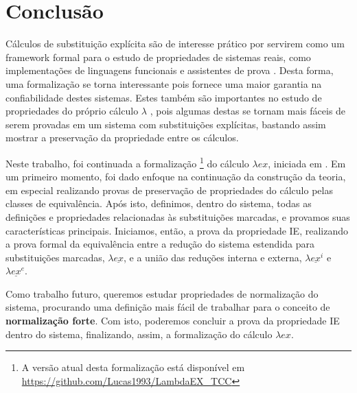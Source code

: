\chapter{Conclusão}

Cálculos de substituição explícita são de interesse prático por servirem como um
framework formal para o estudo de propriedades de sistemas reais, como
implementações de linguagens funcionais e assistentes de prova \cite{levy1999}.
Desta forma, uma formalização se torna interessante pois fornece uma maior
garantia na confiabilidade destes sistemas. Estes também são importantes no
estudo de propriedades do próprio cálculo $\lambda$ \cite{ben_cbv, ben_beta},
pois algumas destas se tornam mais fáceis de serem provadas em um sistema com
substituições explícitas, bastando assim mostrar a preservação da propriedade
entre os cálculos.

Neste trabalho, foi continuada a formalização \footnote{ A versão atual desta
    formalização está disponível em
    \url{https://github.com/Lucas1993/LambdaEX_TCC}} do cálculo $\lambda ex$,
iniciada em \cite{initial}. Em um primeiro momento, foi dado enfoque na
continuação da construção da teoria, em especial realizando provas de
preservação de propriedades do cálculo pelas classes de equivalência. Após isto,
definimos, dentro do sistema, todas as definições e propriedades relacionadas às
substituições marcadas, e provamos suas características principais. Iniciamos,
então, a prova da propriedade IE, realizando a prova formal da equivalência
entre a redução do sistema estendida para substituições marcadas, $\lambda
\underline{ex}$, e a união das reduções interna e externa, $\lambda
\underline{ex}^i$ e $\lambda \underline{ex}^e$.

Como trabalho futuro, queremos estudar propriedades de normalização do sistema,
procurando uma definição mais fácil de trabalhar para o conceito de
\textbf{normalização forte}. Com isto, poderemos concluir a prova da propriedade
IE dentro do sistema, finalizando, assim, a formalização do cálculo $\lambda
ex$.

